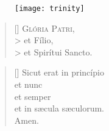 \documentclass[omni.tex]{subfiles}
\begin{document}
\begin{figure}
{\begin{center}
    \texttt{[image: trinity]}
\end{center}}
\end{figure}

\settowidth{\versewidth}{Et ne nos ind\'ucas in tentati\'onem}

\begin{verse}[\versewidth]
\lettrine[lhang=1.0,nindent=0em]{G}{l\'oria Patri}, \\>
et F\'ilio, \\>
et Spir\'itui Sancto.
\end{verse}

\begin{verse}[\versewidth]
Sicut erat in princ\'ipio \\
et nunc \\
et semper \\
et in s\ae cula s\ae culorum. \\
Amen. \\[7\baselineskip]
\end{verse}

\pagebreak
\end{document}
